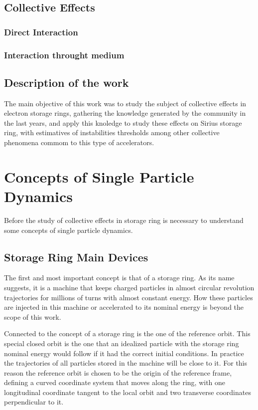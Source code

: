 \documentclass[
	12pt,				%
	openright,			%
	oneside,			%
	a4paper,		%
	chapter=TITLE,		%
	section=TITLE,		%
    brazil,				%
	english,			%
	sumario=tradicional,
	]{abntex2}
\begin{document}
  \section{Collective Effects}
    \subsection{Direct Interaction}
    \subsection{Interaction throught medium}
  \section{Description of the work}

  The main objective of this work was to study the subject of collective effects in electron storage rings, gathering the knowledge generated by the community in the last years, and apply this knoledge to study these effects on Sirius storage ring, with estimatives of instabilities thresholds among other collective phenomena commom to this type of accelerators.


\chapter{Concepts of Single Particle Dynamics}

Before the study of collective effects in storage ring is necessary to understand some concepts of single particle dynamics.

  \section{Storage Ring Main Devices} \label{ssec:storage_ring_main_devices}

  The first and most important concept is that of a storage ring. As its name suggests, it is a machine that keeps charged particles in almost circular revolution trajectories for millions of turns with almost constant energy. How these particles are injected in this machine or accelerated to its nominal energy is beyond the scope of this work.

  Connected to the concept of a storage ring is the one of the reference orbit. This special closed orbit is the one that an idealized particle with the storage ring nominal energy would follow if it had the correct initial conditions. In practice the trajectories of all particles stored in the machine will be close to it. For this reason the reference orbit is chosen to be the origin of the reference frame, defining a curved coordinate system that moves along the ring, with one longitudinal coordinate tangent to the local orbit and two transverse coordinates perpendicular to it.
\end{document}
